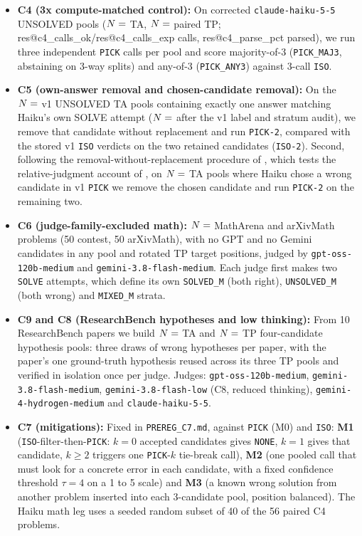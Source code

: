 \documentclass[10pt,twocolumn]{article}
\makeatletter
\newcommand{\res}[1]{\csname res@#1\endcsname}
\makeatother
\begin{document}
\begin{itemize}\setlength{\itemsep}{2pt}
\item \textbf{C4 (3x compute-matched control):} On corrected \texttt{claude-haiku-5-5} UNSOLVED pools ($N=\res{c4_n_ta}$ TA, $N=\res{c4_n_tp}$ paired TP; \res{c4_calls_ok}/\res{c4_calls_exp} calls, \res{c4_parse_pct} parsed), we run three independent \texttt{PICK} calls per pool and score majority-of-3 (\texttt{PICK\_MAJ3}, abstaining on 3-way splits) and any-of-3 (\texttt{PICK\_ANY3}) against 3-call \texttt{ISO}.
\item \textbf{C5 (own-answer removal and chosen-candidate removal):} On the $N=\res{c5o_all_n}$ v1 UNSOLVED TA pools containing exactly one answer matching Haiku's own SOLVE attempt ($N=\res{c5o_corr_n}$ after the v1 label and stratum audit), we remove that candidate without replacement and run \texttt{PICK-2}, compared with the stored v1 \texttt{ISO} verdicts on the two retained candidates (\texttt{ISO-2}). Second, following the removal-without-replacement procedure of \citet{wells1993what}, which tests the relative-judgment account of \citet{wells1984psychology}, on $N=\res{c5w_n}$ TA pools where Haiku chose a wrong candidate in v1 \texttt{PICK} we remove the chosen candidate and run \texttt{PICK-2} on the remaining two.
\item \textbf{C6 (judge-family-excluded math):} $N=\res{c6_n_problems}$ MathArena and arXivMath problems (50 contest, 50 arXivMath), with no GPT and no Gemini candidates in any pool and rotated TP target positions, judged by \texttt{gpt-oss-120b-medium} and \texttt{gemini-3.8-flash-medium}. Each judge first makes two \texttt{SOLVE} attempts, which define its own \texttt{SOLVED\_M} (both right), \texttt{UNSOLVED\_M} (both wrong) and \texttt{MIXED\_M} strata.
\item \textbf{C9 and C8 (ResearchBench hypotheses and low thinking):} From 10 ResearchBench papers \citep{liu2025researchbench} we build $N=\res{c9_n_items}$ TA and $N=\res{c9_n_items}$ TP four-candidate hypothesis pools: three draws of wrong hypotheses per paper, with the paper's one ground-truth hypothesis reused across its three TP pools and verified in isolation once per judge. Judges: \texttt{gpt-oss-120b-medium}, \texttt{gemini-3.8-flash-medium}, \texttt{gemini-3.8-flash-low} (C8, reduced thinking), \texttt{gemini-4-hydrogen-medium} and \texttt{claude-haiku-5-5}.
\item \textbf{C7 (mitigations):} Fixed in \texttt{PREREG\_C7.md}, against \texttt{PICK} (M0) and \texttt{ISO}: \textbf{M1} (\texttt{ISO}-filter-then-\texttt{PICK}: $k=0$ accepted candidates gives \texttt{NONE}, $k=1$ gives that candidate, $k \ge 2$ triggers one \texttt{PICK}-$k$ tie-break call), \textbf{M2} (one pooled call that must look for a concrete error in each candidate, with a fixed confidence threshold $\tau = 4$ on a 1 to 5 scale) and \textbf{M3} (a known wrong solution from another problem inserted into each 3-candidate pool, position balanced). The Haiku math leg uses a seeded random subset of 40 of the 56 paired C4 problems.
\end{itemize}
\end{document}
